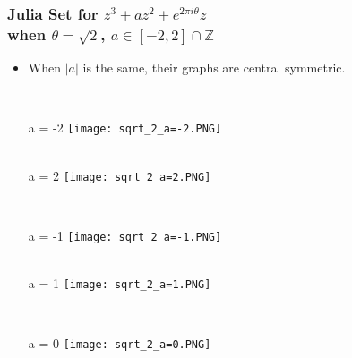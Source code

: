 \documentclass[leqno,handout]{beamer}
\begin{document}
\begin{frame} 

    
\frametitle{Julia Set for $z^{3}+a z^{2} + e^{2 \pi i \theta}z$ \\ when $\theta = \sqrt{2}$, $a\in [-2,2] \cap \mathbb{Z}$} 

\begin{itemize}
\item  When $\lvert a \rvert$ is the same, their graphs are central symmetric.
\\

\begin{column}{0.3\textwidth}
      	\begin{center}
      	\\a = -2
        \texttt{[image: sqrt\_2\_a=-2.PNG]}
        \end{center}
        \begin{center}
        \\a = 2
        \texttt{[image: sqrt\_2\_a=2.PNG]}
        \end{center}
\end{column}
\begin{column}{0.3\textwidth}
      	\begin{center}
      	\\a = -1
        \texttt{[image: sqrt\_2\_a=-1.PNG]}
        \end{center}
        \begin{center}
        \\a = 1
        \texttt{[image: sqrt\_2\_a=1.PNG]}
        \end{center}
\end{column}
\begin{column}{0.3\textwidth}
      	\begin{center}
      	\\a = 0
        \texttt{[image: sqrt\_2\_a=0.PNG]}
        \end{center}
\end{column}

\end{itemize}

\end{frame}
\end{document}
